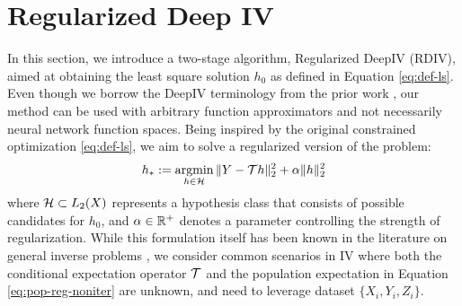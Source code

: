 \vspace{-2mm}
\section{Regularized Deep IV}\label{sec:method-intro}
\vspace{-2mm}

In this section, we introduce a two-stage algorithm, Regularized DeepIV (RDIV), aimed at obtaining the least square solution $h_0$ as defined in Equation \eqref{eq:def-ls}. Even though we borrow the DeepIV terminology from the prior work \citep{hartford2017deep}, our method can be used with arbitrary function approximators and not necessarily neural network function spaces.
Being inspired by the original constrained optimization \eqref{eq:def-ls}, we aim to solve a regularized version of the problem: \begin{align}\label{eq:pop-reg-noniter}
h_{*} := \mathop{\mathrm{argmin}}_{h\in \mathcal{H}} \|Y-{\mathcal{T}} h \|_2^2 + \alpha \|h\|_2^2
\end{align}
where $\mathcal{H} \subset L_2(X)$ represents a hypothesis class that consists of possible candidates for $h_0$, and $\alpha\in \mathbb{R}^+$ denotes a parameter controlling the strength of regularization. 
While this formulation itself has been known in the literature on general inverse problems \citep{cavalier2011inverse,mendelson2010regularization}, we consider common scenarios in IV   where both the conditional expectation operator ${\mathcal{T}}$ and the population expectation in Equation \eqref{eq:pop-reg-noniter} are unknown, and need to leverage dataset $\{X_i,Y_i,Z_i\}$.  

